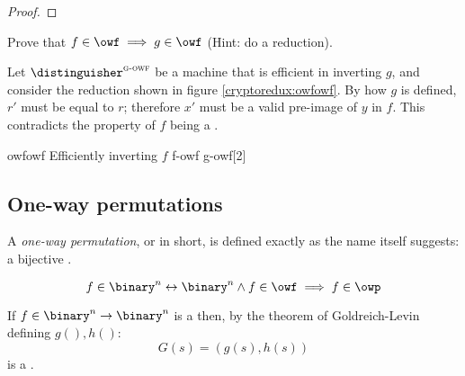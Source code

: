 \begin{proof}
\end{proof}

\begin{exercise} \label{ex:owfcomp}
    Prove that $f \in \owf \implies g \in \owf$ (Hint: do a reduction).
\end{exercise}

\begin{solution}[\ref{ex:owfcomp}]
    Let $\distinguisher^{\textsc{g-owf}}$ be a machine that is efficient in inverting $g$, and consider the reduction shown in figure \ref{cryptoredux:owfowf}. By how $g$ is defined, $r'$ must be equal to $r$; therefore $x'$ must be a valid pre-image of $y$ in $f$. This contradicts the property of $f$ being a \owf.

    \begin{cryptoredux}
        {owfowf}
        {Efficiently inverting $f$}
        {f-owf}
        {g-owf}[2]
        




    \end{cryptoredux}

\end{solution}

\subsection{One-way permutations}

A \emph{one-way permutation}, or \owp{} in short, is defined exactly as the name itself suggests: a bijective \owf{}.

\[
    f \in \binary^n \leftrightarrow \binary^n \wedge f \in \owf \implies f \in \owp
\]

\begin{corollary}
    If $f \in \binary^n \to \binary^n$ is a \owp{} then, by the theorem of Goldreich-Levin defining $g(), h()$:
    \[
        G(s) = (g(s), h(s))
    \]
    is a \prg.
\end{corollary}


